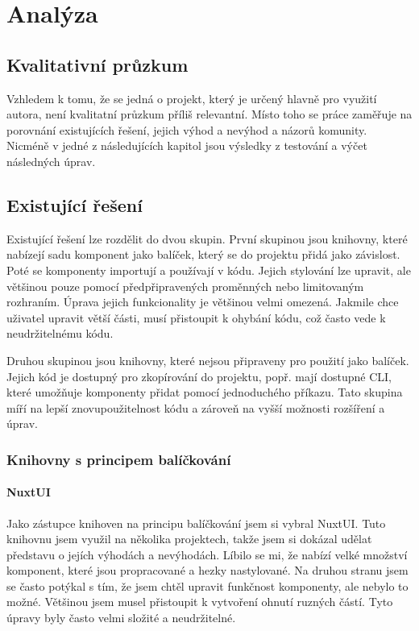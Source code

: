 
\chapter{Analýza}

\section{Kvalitativní průzkum}
Vzhledem k tomu, že se jedná o projekt, který je určený hlavně pro využití autora, není kvalitatní průzkum příliš relevantní.
Místo toho se práce zaměřuje na porovnání existujících řešení, jejich výhod a nevýhod a názorů komunity.
Nicméně v jedné z následujících kapitol jsou výsledky z testování a výčet následných úprav.

\section{Existující řešení}

Existující řešení lze rozdělit do dvou skupin. První skupinou jsou knihovny, které nabízejí sadu komponent jako balíček, který
se do projektu přidá jako závislost. Poté se komponenty importují a používají v kódu. Jejich stylování lze upravit, ale většinou
pouze pomocí předpřipravených proměnných nebo limitovaným rozhraním. Úprava jejich funkcionality je většinou velmi omezená. Jakmile
chce uživatel upravit větší části, musí přistoupit k ohybání kódu, což často vede k neudržitelnému kódu.

Druhou skupinou jsou knihovny, které nejsou připraveny pro použití jako balíček. Jejich kód je dostupný pro zkopírování do projektu,
popř. mají dostupné CLI, které umožňuje komponenty přidat pomocí jednoduchého příkazu. Tato skupina míří na lepší znovupoužitelnost kódu
a zároveň na vyšší možnosti rozšíření a úprav.

\clearpage

\subsection{Knihovny s principem balíčkování}

\subsubsection{NuxtUI}
Jako zástupce knihoven na principu balíčkování jsem si vybral NuxtUI. Tuto knihovnu jsem využil na několika projektech, takže jsem si
dokázal udělat představu o jejích výhodách a nevýhodách. Líbilo se mi, že nabízí velké množství komponent, které jsou propracované a hezky
nastylované. Na druhou stranu jsem se často potýkal s tím, že jsem chtěl upravit funkčnost komponenty, ale nebylo to možné. Většinou jsem
musel přistoupit k vytvoření ohnutí ruzných částí. Tyto úpravy byly často velmi složité a neudržitelné.

